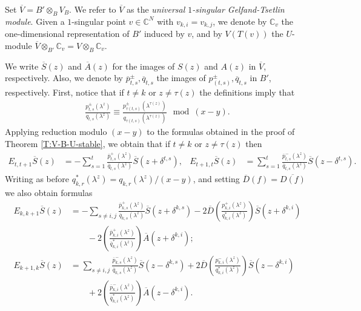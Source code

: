 \documentclass[11pt,fleqn]{article}
\newcommand\CC{\mathbb C}
\newcommand\ot{\otimes}
\begin{document}
\begin{Definition}
Set $\overline V = B' \ot_B V_B$. We refer to $\overline V$ as the 
\emph{universal $1$-singular Gelfand-Tsetlin module}.
Given a $1$-singular point $v \in \CC^N$ with $v_{k,i} = v_{k,j}$, we denote by
$\CC_v$ the one-dimensional representation of $B'$ induced by $v$, and by 
$V(T(v))$ the $U$-module $\overline V \ot_{B'} \CC_v = V \ot_B \CC_v$.
\end{Definition}
We write $\overline S(z)$ and $\overline A(z)$ for the images of $S(z)$ and 
$A(z)$ in $\overline V$, respectively. Also, we denote by $\overline 
p^\pm_{t,s}, \overline q_{t,s}$ the images of $p^{\pm}_{(t,s)}, 
\overline q_{t,s}$ in $B'$, respectively. First, notice that if $t \neq k$ or 
$z \neq \tau (z)$ the definitions imply that
\begin{align*}
\frac{p_{t,s}^\pm(\lambda^z)}{q_{t,s}(\lambda^z)} \equiv
		\frac{p_{\tau(t,s)}^\pm(\lambda^{\tau(z)})}
			{q_{\tau(t,s)}(\lambda^{\tau(z)})} \mod (x-y).
\end{align*}
Applying reduction modulo $(x-y)$ to the formulas obtained in the proof of
Theorem \ref{T:V-B-U-stable}, we obtain that if $t \neq k$ or $z \neq 
\tau(z)$ then
\begin{align*}
E_{t,t+1} \overline S(z)
	&= -\sum_{s=1}^t \frac{\overline p^+_{t,s}(\lambda^z)}
		{\overline q_{t,s}(\lambda^z)} 
		\overline S(z+\delta^{t,s}), 
&E_{t+1,t} \overline S(z)
	&= \sum_{s=1}^t \frac{\overline p^-_{t,s}(\lambda^z)}
		{\overline q_{t,s}(\lambda^z)} 
		\overline S(z-\delta^{t,s}).
\end{align*}
Writing as before $q_{k,r}^*(\lambda^z) = q_{k,r}(\lambda^z)/(x-y)$, and 
setting $\overline D(f) = \overline{D(f)}$ we also obtain formulas
\begin{align*}
E_{k,k+1} \overline S(z)
	&= -\sum_{s \neq i,j} \frac{\overline p^+_{k,s}(\lambda^z)}
		{\overline q_{k,s}(\lambda^z)} 
		\overline S(z+\delta^{k,s}) 
	- 2 \overline D\left(
		\frac{p^+_{k,i}(\lambda^z)}{q^*_{k,i}(\lambda^z)}
	\right) \overline S(z + \delta^{k,i}) \\
	& \qquad - 2 \left(
		\frac{\overline p^+_{k,i}(\lambda^z)}{\overline q^*_{k,i}(\lambda^z)}
	\right) \overline A(z+\delta^{k,i}); \\
E_{k+1,k} \overline S(z)
	&= \sum_{s \neq i,j} \frac{\overline p^-_{k,s}(\lambda^z)}
		{\overline q_{k,s}(\lambda^z)} 
		\overline S(z-\delta^{k,s}) 
	+ 2\overline D\left(
		\frac{p^-_{k,i}(\lambda^z)}{q^*_{k,i}(\lambda^z)}
	\right) \overline S(z - \delta^{k,i}) \\
	& \qquad + 2 \left(
		\frac{\overline p^-_{k,i}(\lambda^z)}{\overline q^*_{k,i}(\lambda^z)}
	\right) \overline A(z - \delta^{k,i}).
\end{align*}
\end{document}
